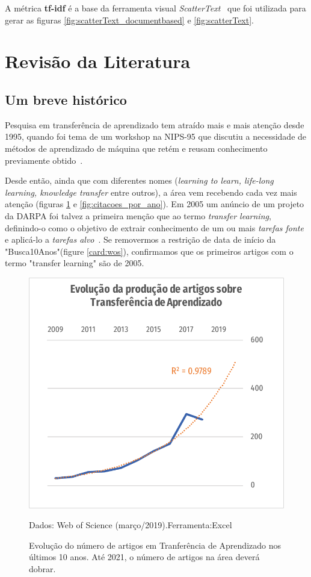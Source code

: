 \documentclass[sigconf]{acmart}
\newcommand{\source}[2]{\raggedleft{}\vspace*{-7mm}\caption*{ \textmd{\scriptsize{Dados: {#1}.\hfill Ferramenta:{#2}}}}}
\begin{document}
\begin{enumerate}[a)]
{  A métrica \textbf{tf-idf} é a base da ferramenta visual \emph{ScatterText}~\cite{kessler2017scattertext} que foi utilizada para gerar as figuras \ref{fig:scatterText_documentbased} e \ref{fig:scatterText}.

  }\label{analiseTextual}
\end{enumerate}



\section{Revisão da Literatura}\label{literatura}
  \subsection{Um breve histórico}
  Pesquisa em transferência de aprendizado tem atraído mais e mais atenção desde 1995, quando foi tema de  um workshop na NIPS-95 que discutiu a necessidade de métodos de aprendizado de máquina que retém e reusam conhecimento previamente obtido~\cite{PanYang}. 
  
  Desde então, ainda que com diferentes nomes (\emph{learning to learn, life-long learning, knowledge transfer} entre outros), a área vem recebendo cada vez mais atenção (figuras \ref{fig:artigos_por_ano} e \ref{fig:citacoes_por_ano}). Em 2005 um anúncio de um projeto da DARPA foi talvez a primeira menção que ao termo \emph{transfer learning}, definindo-o como o objetivo de extrair conhecimento de um ou mais \emph{tarefas fonte} e aplicá-lo a \emph{tarefas alvo}~\cite{PanYang}. Se removermos a restrição de data de início da "Busca10Anos"(figure \ref{card:wos}), confirmamos que os primeiros artigos com o termo "transfer learning" são de 2005.

  \begin{figure}[h]
    \includegraphics[width=\columnwidth]{artigos_por_ano}
    \source{Web of Science (março/2019)}{Excel}
    \caption{Evolução do número de artigos em Tranferência de Aprendizado nos últimos 10 anos. Até 2021, o número de artigos na área deverá dobrar.}
    \label{fig:artigos_por_ano}
  \end{figure}
\end{document}
